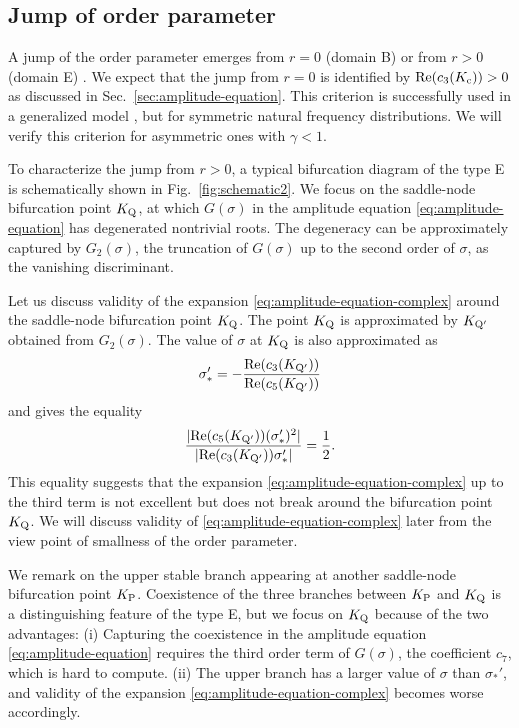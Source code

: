 \subsection{Jump of order parameter}
\label{sec:jump}

A jump of the order parameter emerges from $r=0$ (domain B)
or from $r>0$ (domain E) .
We expect that the jump from $r=0$ is identified
by ${\rm Re}(c_{3}(K_{\rm c}))>0$
as discussed in Sec.~\ref{sec:amplitude-equation}.
This criterion is successfully used in a generalized model \cite{barre2016},
but for symmetric natural frequency distributions.
We will verify this criterion for asymmetric ones with $\gamma<1$.

To characterize the jump from $r>0$,
a typical bifurcation diagram of the type E is schematically shown
in Fig.~\ref{fig:schematic2}.
We focus on the saddle-node bifurcation point $K_{\rm Q}$,
at which $G(\sigma)$ in the amplitude equation \eqref{eq:amplitude-equation}
has degenerated nontrivial roots.
The degeneracy can be approximately captured by $G_{2}(\sigma)$,
the truncation of $G(\sigma)$ up to the second order of $\sigma$,
as the vanishing discriminant.

Let us discuss validity of the expansion \eqref{eq:amplitude-equation-complex}
around the saddle-node bifurcation point $K_{\rm Q}$.
The point $K_{\rm Q}$ is approximated by $K_{\rm Q'}$ obtained from $G_{2}(\sigma)$.
The value of $\sigma$ at $K_{\rm Q}$ is also approximated as
\begin{align}
  \sigma_{\ast}' = - \dfrac{{\rm Re}(c_{3}(K_{\rm Q'}))}{{\rm Re}(c_{5}(K_{\rm Q'}))}
\end{align}
and gives the equality
\begin{align}
  \label{eq:ratio-35}
  \dfrac{|{\rm Re}(c_{5}(K_{\rm Q'}))(\sigma_{\ast}')^{2}|}
  {|{\rm Re}(c_{3}(K_{\rm Q'}))\sigma_{\ast}'|} = \dfrac{1}{2}.
\end{align}
This equality suggests that the expansion \eqref{eq:amplitude-equation-complex}
up to the third term is not excellent but
does not break around the bifurcation point $K_{\rm Q}$.
We will discuss validity of \eqref{eq:amplitude-equation-complex} later
from the view point of smallness of the order parameter.

We remark on the upper stable branch appearing
at another saddle-node bifurcation point $K_{\rm P}$.
Coexistence of the three branches between $K_{\rm P}$ and $K_{\rm Q}$
is a distinguishing feature of the type E,
but we focus on $K_{\rm Q}$ because of the two advantages:
(i) Capturing the coexistence in the amplitude equation
\eqref{eq:amplitude-equation} requires the third order term of $G(\sigma)$,
the coefficient $c_{7}$, which is hard to compute.
(ii) The upper branch has a larger value of $\sigma$ than $\sigma_{\ast}'$,
and validity of the expansion \eqref{eq:amplitude-equation-complex}
becomes worse accordingly.



